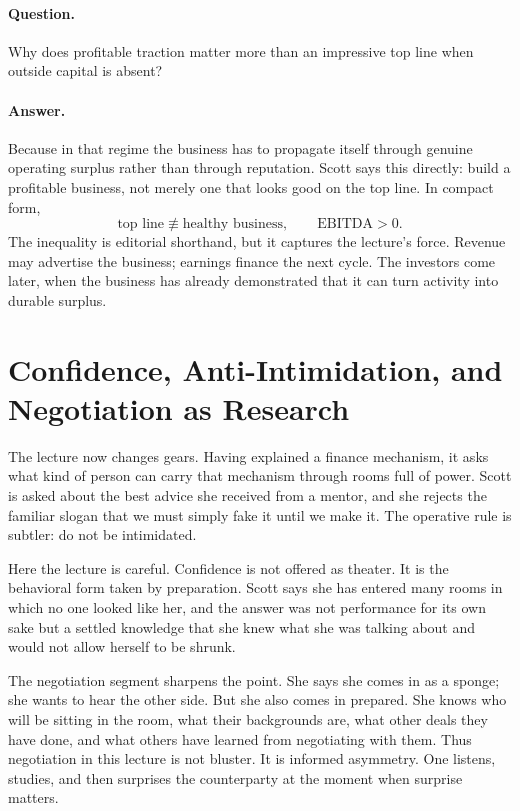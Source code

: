 \paragraph{Question.} Why does profitable traction matter more than an impressive top line when outside capital is absent?

\paragraph{Answer.} Because in that regime the business has to propagate itself through genuine operating surplus rather than through reputation. Scott says this directly: build a profitable business, not merely one that looks good on the top line. In compact form,
\begin{equation}
\text{top line} \not\equiv \text{healthy business},
\qquad
\mathrm{EBITDA}>0.
\end{equation}
The inequality is editorial shorthand, but it captures the lecture's force. Revenue may advertise the business; earnings finance the next cycle. The investors come later, when the business has already demonstrated that it can turn activity into durable surplus.

\section{Confidence, Anti-Intimidation, and Negotiation as Research}

The lecture now changes gears. Having explained a finance mechanism, it asks what kind of person can carry that mechanism through rooms full of power. Scott is asked about the best advice she received from a mentor, and she rejects the familiar slogan that we must simply fake it until we make it. The operative rule is subtler: do not be intimidated.

Here the lecture is careful. Confidence is not offered as theater. It is the behavioral form taken by preparation. Scott says she has entered many rooms in which no one looked like her, and the answer was not performance for its own sake but a settled knowledge that she knew what she was talking about and would not allow herself to be shrunk.

The negotiation segment sharpens the point. She says she comes in as a sponge; she wants to hear the other side. But she also comes in prepared. She knows who will be sitting in the room, what their backgrounds are, what other deals they have done, and what others have learned from negotiating with them. Thus negotiation in this lecture is not bluster. It is informed asymmetry. One listens, studies, and then surprises the counterparty at the moment when surprise matters.


